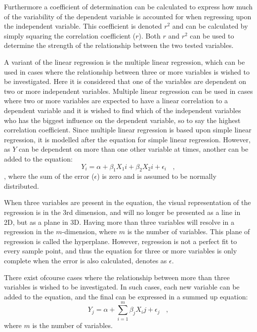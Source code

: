 Furthermore a coefficient of determination can be calculated to express how much of the variability of the dependent variable is accounted for when regressing upon the independent variable. This coefficient is denoted $r^{2}$ and can be calculated by simply squaring the correlation coefficient ($r$). 
Both $r$ and $r^{2}$ can be used to determine the strength of the relationship between the two tested variables. \cite{zar2009}



A variant of the linear regression is the multiple linear regression, which can be used in cases where the relationship between three or more variables is wished to be investigated. Here it is considered that one of the variables are dependent on two or more independent variables. 
Multiple linear regression can be used in cases where two or more variables are expected to have a linear correlation to a dependent variable and it is wished to find which of the independent variables who has the biggest influence on the dependent variable, so to say the highest correlation coefficient. 
Since multiple linear regression is based upon simple linear regression, it is modelled after the equation for simple linear regression. However, as $Y$ can be dependent on more than one other variable at times, another can be added to the equation: \cite{zar2009}
\begin{equation}
Y_i = \alpha + \beta_1 X_1i + \beta_2 X_2i + \epsilon_i \ \ \ \ ,
\end{equation}
, where the sum of the error ($\epsilon$) is zero and is assumed to be normally distributed.

When three variables are present in the equation, the visual representation of the regression is in the 3rd dimension, and will no longer be presented as a line in 2D, but as a plane in 3D. Having more than three variables will resolve in a regression in the $m$-dimension, where $m$ is the number of variables. This plane of regression is called the hyperplane. However, regression is not a perfect fit to every sample point, and thus the equation for three or more variables is only complete when the error is also calculated, denotes as $\epsilon$.

There exist ofcourse cases where the relationship between more than three variables is wished to be investigated. In such cases, each new variable can be added to the equation, and the final can be expressed in a summed up equation: \cite{zar2009}
\begin{equation}
Y_j = \alpha + \sum_{i=1}^{m} \beta_j X_ij + \epsilon_j \ \ \ \ ,
\end{equation}
where $m$ is the number of variables.

